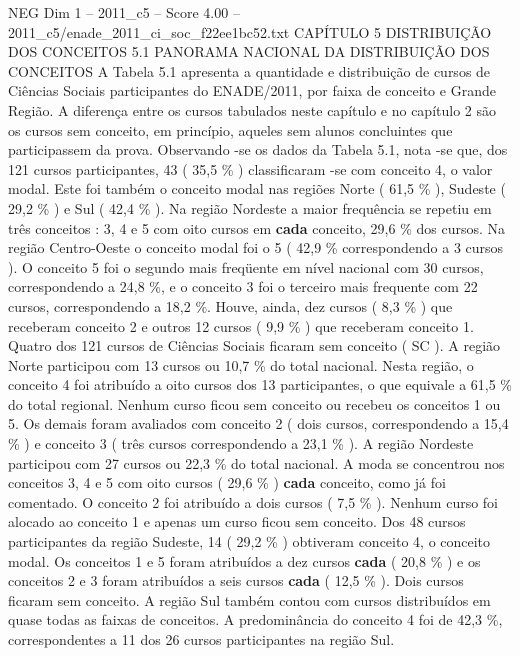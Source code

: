 \begin{textsample}{NEG Dim 1 – 2011\_c5 – Score 4.00 – 2011\_c5/enade\_2011\_ci\_soc\_f22ee1bc52.txt}  \label{ex:f1_neg_313}
CAPÍTULO 5 DISTRIBUIÇÃO DOS CONCEITOS 5.1 PANORAMA NACIONAL DA DISTRIBUIÇÃO DOS CONCEITOS A Tabela 5.1 apresenta a quantidade e distribuição de cursos de Ciências Sociais participantes do ENADE/2011, por faixa de conceito e Grande Região.
A diferença entre os cursos tabulados neste capítulo e no capítulo 2 são os cursos sem conceito, em princípio, aqueles sem alunos concluintes que participassem da prova.
Observando -se os dados da Tabela 5.1, nota -se que, dos 121 cursos participantes, 43 ( 35,5 \% ) classificaram -se com conceito 4, o valor modal.
Este foi também o conceito modal nas regiões Norte ( 61,5 \% ), Sudeste ( 29,2 \% ) e Sul ( 42,4 \% ).
Na região Nordeste a maior frequência se repetiu em três conceitos : 3, 4 e 5 com oito cursos em \textbf{cada} conceito, 29,6 \% dos cursos.
Na região Centro-Oeste o conceito modal foi o 5 ( 42,9 \% correspondendo a 3 cursos ).
O conceito 5 foi o segundo mais freqüente em nível nacional com 30 cursos, correspondendo a 24,8 \%, e o conceito 3 foi o terceiro mais frequente com 22 cursos, correspondendo a 18,2 \%.
Houve, ainda, dez cursos ( 8,3 \% ) que receberam conceito 2 e outros 12 cursos ( 9,9 \% ) que receberam conceito 1.
Quatro dos 121 cursos de Ciências Sociais ficaram sem conceito ( SC ).
A região Norte participou com 13 cursos ou 10,7 \% do total nacional.
Nesta região, o conceito 4 foi atribuído a oito cursos dos 13 participantes, o que equivale a 61,5 \% do total regional.
Nenhum curso ficou sem conceito ou recebeu os conceitos 1 ou 5.
Os demais foram avaliados com conceito 2 ( dois cursos, correspondendo a 15,4 \% ) e conceito 3 ( três cursos correspondendo a 23,1 \% ).
A região Nordeste participou com 27 cursos ou 22,3 \% do total nacional.
A moda se concentrou nos conceitos 3, 4 e 5 com oito cursos ( 29,6 \% ) \textbf{cada} conceito, como já foi comentado.
O conceito 2 foi atribuído a dois cursos ( 7,5 \% ).
Nenhum curso foi alocado ao conceito 1 e apenas um curso ficou sem conceito.
Dos 48 cursos participantes da região Sudeste, 14 ( 29,2 \% ) obtiveram conceito 4, o conceito modal.
Os conceitos 1 e 5 foram atribuídos a dez cursos \textbf{cada} ( 20,8 \% ) e os conceitos 2 e 3 foram atribuídos a seis cursos \textbf{cada} ( 12,5 \% ).
Dois cursos ficaram sem conceito.
A região Sul também contou com cursos distribuídos em quase todas as faixas de conceitos.
A predominância do conceito 4 foi de 42,3 \%, correspondentes a 11 dos 26 cursos participantes na região Sul.

\end{textsample}
